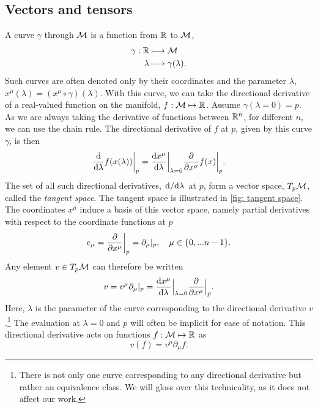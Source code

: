 \subsection{Vectors and tensors}

A curve $\gamma$ through $\mathcal{M}$ is a function from $\mathbb{R}$ to $\mathcal{M}$,
%
\begin{align}
    \gamma : \mathbb{R} &\longmapsto \mathcal{M} \\
    \lambda & \longmapsto \gamma(\lambda).
\end{align}
%
Such curves are often denoted only by their coordinates and the parameter $\lambda$, $x^\mu(\lambda) = (x^\mu \circ \gamma)(\lambda)$.
With this curve, we can take the directional derivative of a real-valued function on the manifold, $f: \mathcal{M} \mapsto \mathbb{R}$.
Assume $\gamma(\lambda = 0) = p$.
As we are always taking the derivative of functions between $\mathbb{R}^n$, for different $n$, we can use the chain rule.
The directional derivative of $f$ at $p$, given by this curve $\gamma$, is then
%
\begin{equation}
    \odv{}{\lambda} f(x(\lambda)) \bigg |_p = \odv{x^\mu}{\lambda} \bigg |_{\lambda = 0}  \pdv{}{x^\mu} f(x) \bigg |_p.
\end{equation}
%
The set of all such directional derivatives, $\odv{}/{\lambda}$ at $p$, form a vector space, $T_p \mathcal{M}$, called the \emph{tangent space}.
The tangent space is illustrated in \autoref{fig: tangent space}.
The coordinates $x^\mu$ induce a basis of this vector space, namely partial derivatives with respect to the coordinate functions at $p$
%
\begin{equation}
    e_\mu = \pdv{}{x^\mu} \bigg|_p = \partial_\mu|_p, \quad \mu \in \{0, ... n-1\}.
\end{equation}
%
Any element $v \in T_p \mathcal{M}$ can therefore be written
%
\begin{equation}
    v = v^\mu \partial_\mu |_p = \odv{x^\mu}{\lambda}\Big |_{\lambda = 0} \pdv{}{x^\mu}\Big |_p.
\end{equation}
%
Here, $\lambda$ is the parameter of the curve corresponding to the directional derivative $v$.\footnote{%
There is not only one curve corresponding to any directional derivative but rather an equivalence class. We will gloss over this technicality, as it does not affect our work.
}
The evaluation at $\lambda = 0$ and $p$ will often be implicit for ease of notation.
This directional derivative acts on functions $f : \mathcal{M} \mapsto \mathbb{R}$ as
%
\begin{equation}
    v(f) = v^\mu \partial_\mu f.
\end{equation}
%

